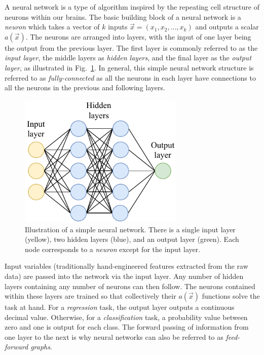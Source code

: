 A neural network is a type of algorithm inspired by the repeating cell structure of neurons within
our brains. The basic building block of a neural network is a \emph{neuron} which takes a vector
of $k$ inputs $\vec{x} = (x_{1}, x_{2},\dots,x_{k})$ and outputs a scalar $a(\vec{x})$. The
neurons are arranged into layers, with the input of one layer being the output from the previous
layer. The first layer is commonly referred to as the \emph{input layer}, the middle layers as
\emph{hidden layers}, and the final layer as the \emph{output layer}, as illustrated in
Fig.~\ref{fig:network}. In general, this simple neural network structure is referred to as
\emph{fully-connected} as all the neurons in each layer have connections to all the neurons in the
previous and following layers.

\begin{figure} %
    \includegraphics[width=0.7\textwidth]{diagrams/6-cnn/network.pdf}
    \caption[Illustration of a simple neural network]
    {Illustration of a simple neural network. There is a single input layer (yellow), two hidden
        layers (blue), and an output layer (green). Each node corresponds to a \emph{neuron}
        except for the input layer.}
    \label{fig:network}
\end{figure}

Input variables (traditionally hand-engineered features extracted from the raw data) are passed
into the network via the input layer. Any number of hidden layers containing any number of neurons
can then follow. The neurons contained within these layers are trained so that collectively their
$a(\vec{x})$ functions solve the task at hand. For a \emph{regression} task, the output layer
outputs a continuous decimal value. Otherwise, for a \emph{classification} task, a probability
value between zero and one is output for each class. The forward passing of information from one
layer to the next is why neural networks can also be referred to as \emph{feed-forward graphs}.

